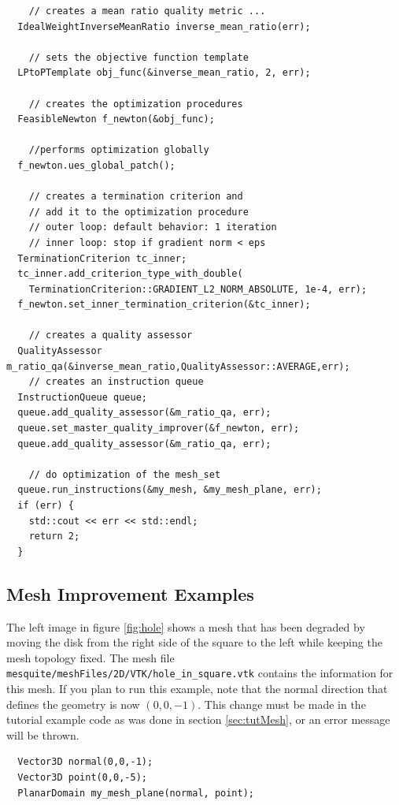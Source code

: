 \begin{verbatim}
    // creates a mean ratio quality metric ...
  IdealWeightInverseMeanRatio inverse_mean_ratio(err);

    // sets the objective function template
  LPtoPTemplate obj_func(&inverse_mean_ratio, 2, err);
  
    // creates the optimization procedures
  FeasibleNewton f_newton(&obj_func);

    //performs optimization globally
  f_newton.ues_global_patch(); 

    // creates a termination criterion and 
    // add it to the optimization procedure
    // outer loop: default behavior: 1 iteration
    // inner loop: stop if gradient norm < eps
  TerminationCriterion tc_inner;
  tc_inner.add_criterion_type_with_double(
    TerminationCriterion::GRADIENT_L2_NORM_ABSOLUTE, 1e-4, err); 
  f_newton.set_inner_termination_criterion(&tc_inner);

    // creates a quality assessor
  QualityAssessor m_ratio_qa(&inverse_mean_ratio,QualityAssessor::AVERAGE,err);
    // creates an instruction queue
  InstructionQueue queue;
  queue.add_quality_assessor(&m_ratio_qa, err); 
  queue.set_master_quality_improver(&f_newton, err); 
  queue.add_quality_assessor(&m_ratio_qa, err); 

    // do optimization of the mesh_set
  queue.run_instructions(&my_mesh, &my_mesh_plane, err); 
  if (err) {
    std::cout << err << std::endl;
    return 2;
  }
\end{verbatim} 

\subsection{Mesh Improvement Examples}

The left image in figure \ref{fig:hole} shows a mesh that has
been degraded by moving the disk from the right side of the square to
the left while keeping the mesh topology fixed.
The mesh file
\texttt{mesquite/meshFiles/2D/VTK/hole\_in\_square.vtk} contains the
information for this mesh.  If you plan to run this example, note that
the normal direction that defines the geometry is now $(0,0,-1)$.
This change must be made in the tutorial example code
as was done in section \ref{sec:tutMesh}, or an error message will be
thrown.
\begin{verbatim}
  Vector3D normal(0,0,-1);
  Vector3D point(0,0,-5);
  PlanarDomain my_mesh_plane(normal, point);
\end{verbatim}


